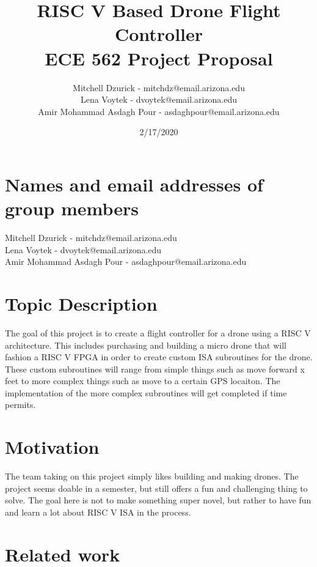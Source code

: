\documentclass[12pt]{article}
\title {{\bf RISC V Based Drone Flight Controller} \\
\large{ECE 562 Project Proposal}}
\author{
Mitchell Dzurick - mitchdz@email.arizona.edu\\
Lena Voytek - dvoytek@email.arizona.edu\\
Amir Mohammad Asdagh Pour - asdaghpour@email.arizona.edu}
\date{2/17/2020}
\begin{document}
\maketitle
\tableofcontents 
\clearpage

\section{Names and email addresses of group members}
Mitchell Dzurick - mitchdz@email.arizona.edu\\
Lena Voytek - dvoytek@email.arizona.edu\\
Amir Mohammad Asdagh Pour - asdaghpour@email.arizona.edu

\section{Topic Description}
The goal of this project is to create a flight controller for a drone using a RISC V architecture. This includes purchasing and building a micro drone that will fashion a RISC V FPGA in order to create custom ISA subroutines for the drone. These custom subroutines will range from simple things such as move forward x feet to more complex things such as move to a certain GPS locaiton. The implementation of the more complex subroutines will get completed if time permits.

\section{Motivation}
The team taking on this project simply likes building and making drones. The project seems doable in a semester, but still offers a fun and challenging thing to solve. The goal here is not to make something super novel, but rather to have fun and learn a lot about RISC V ISA in the process.

\section{Related work}
\iffalse
Related work. What has been previously done similar or related to this topic? (Limit this to 3 –
5 important related works. Your final project will have many more)
\fi
\subsection{}

\subsection{}
\end{document}
